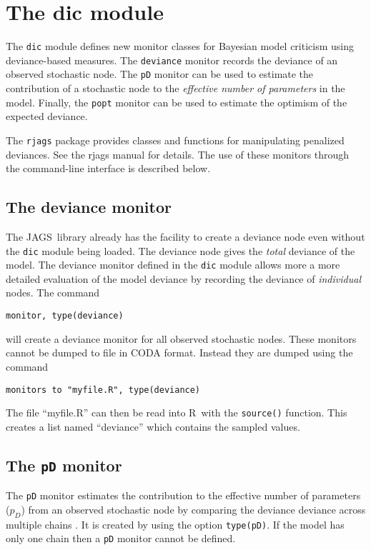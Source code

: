 \documentclass[11pt, a4paper, titlepage]{report}
\newcommand{\JAGS}{\textsf{JAGS}}
\newcommand{\R}{\textsf{R}}
\begin{document}
\section{The dic module}

The \verb+dic+ module defines new monitor classes for Bayesian model
criticism using deviance-based measures. The \texttt{deviance} monitor
records the deviance of an observed stochastic node. The \texttt{pD}
monitor can be used to estimate the contribution of a stochastic node
to the {\em effective number of parameters} in the model. Finally, the
\texttt{popt} monitor can be used to estimate the optimism of the
expected deviance.

The \texttt{rjags} package provides classes and functions for
manipulating penalized deviances. See the rjags manual for details.
The use of these monitors through the command-line interface is
described below.

\subsection{The deviance monitor}

The \JAGS\ library already has the facility to create a deviance node
even without the \verb+dic+ module being loaded.  The deviance node
gives the {\em total} deviance of the model. The deviance monitor
defined in the \verb+dic+ module allows more a more detailed
evaluation of the model deviance by recording the deviance of {\em
  individual} nodes. The command
\begin{verbatim}
monitor, type(deviance)
\end{verbatim}
will create a deviance monitor for all observed stochastic
nodes. These monitors cannot be dumped to file in CODA format. Instead
they are dumped using the command
\begin{verbatim}
monitors to "myfile.R", type(deviance)
\end{verbatim}
The file ``myfile.R'' can then be read into \R\ with the \texttt{source()}
function. This creates a list named ``deviance'' which contains the
sampled values.

\subsection{The \texttt{pD} monitor}

The \verb+pD+ monitor estimates the contribution to the effective
number of parameters ($p_D$) \cite{spiegelhalter:etal:2002} from an
observed stochastic node by comparing the deviance deviance across
multiple chains \cite{plummer:2002}. It is created by using the option
\texttt{type(pD)}. If the model has only one chain then a \verb+pD+
monitor cannot be defined.
\end{document}
